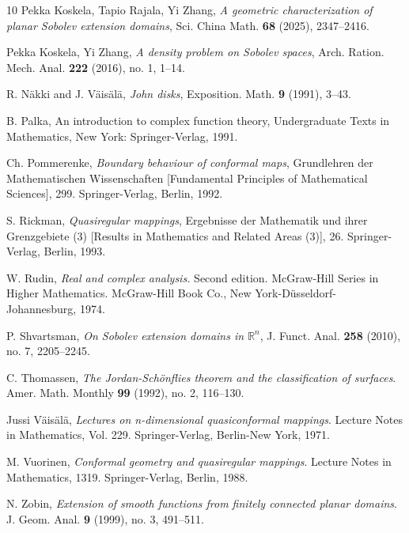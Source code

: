 \documentclass[reqno,11pt]{amsart}
\numberwithin{equation}{section}
\theoremstyle{remark}
\begin{document}
\begin{thebibliography}{10}
Pekka Koskela, Tapio Rajala, Yi Zhang, \emph{A geometric characterization of planar Sobolev extension domains}, Sci. China Math. \textbf{68} (2025), 2347--2416.

Pekka Koskela, Yi Zhang, \emph{A density problem on Sobolev spaces}, Arch. Ration. Mech. Anal. \textbf{222} (2016), no. 1, 1--14. 

 

 R. N\"akki and J. V\"ais\"al\"a, \emph{John disks},
 Exposition. Math. \textbf{9} (1991), 3--43.

 B. Palka, An introduction to complex function theory,
  Undergraduate Texts in Mathematics, New York: Springer-Verlag, 1991.

Ch. Pommerenke, \emph{Boundary behaviour of conformal maps},  
Grundlehren der Mathematischen Wissenschaften [Fundamental Principles of Mathematical Sciences], 299. Springer-Verlag, Berlin, 1992.

S. Rickman, \emph{Quasiregular mappings}, Ergebnisse der Mathematik und ihrer 
Grenzgebiete (3) [Results in Mathematics and Related Areas (3)], 26. 
Springer-Verlag, Berlin, 1993. 


W. Rudin, \emph{
Real and complex analysis.} 
Second edition. McGraw-Hill Series in Higher Mathematics. McGraw-Hill Book Co., New York-D\"usseldorf-Johannesburg, 1974.



 P. Shvartsman, \emph{On Sobolev extension domains in $\mathbb R^n$}, J. Funct. Anal. \textbf{258} (2010), no. 7, 2205--2245.

C. Thomassen, \emph{The Jordan-Sch\"onflies theorem and the classification of surfaces}. 
Amer. Math. Monthly \textbf{99} (1992), no. 2, 116--130. 

Jussi V\"ais\"al\"a,  \emph{Lectures on n-dimensional quasiconformal mappings}. Lecture Notes in Mathematics, Vol. 229. Springer-Verlag, 
Berlin-New York, 1971. 


%
M. Vuorinen, \emph{Conformal geometry and quasiregular mappings}. 
Lecture Notes in Mathematics, 1319. Springer-Verlag, Berlin, 1988. 

N. Zobin, \emph{Extension of smooth functions from finitely connected planar domains}. 
J. Geom. Anal. \textbf{9} (1999), no. 3, 491--511. 


\end{thebibliography}
\end{document}
